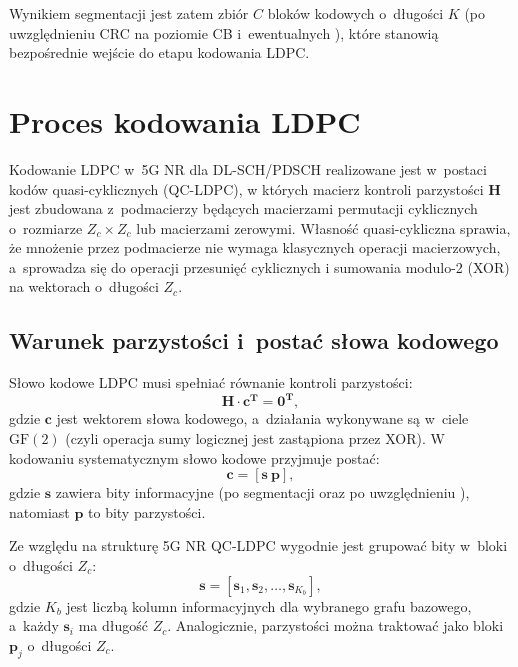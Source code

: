 Wynikiem segmentacji jest zatem zbiór $C$ bloków kodowych o~długości $K$ (po uwzględnieniu CRC na poziomie CB i~ewentualnych ), które stanowią bezpośrednie wejście do etapu kodowania LDPC.




\section{Proces kodowania LDPC}
\label{sec:analiza_proces_kodowania_ldpc}

Kodowanie LDPC w~5G NR dla DL-SCH/PDSCH realizowane jest w~postaci kodów quasi-cyklicznych (QC-LDPC),
w których macierz kontroli parzystości \textbf{H} jest zbudowana z~podmacierzy będących macierzami permutacji cyklicznych o~rozmiarze $Z_c \times Z_c$ lub macierzami zerowymi. Własność quasi-cykliczna sprawia,
że mnożenie przez podmacierze nie wymaga klasycznych operacji macierzowych, a~sprowadza się do operacji przesunięć cyklicznych
i sumowania modulo-2 (XOR) na wektorach o~długości $Z_c$.

\subsection{Warunek parzystości i~postać słowa kodowego}
Słowo kodowe LDPC musi spełniać równanie kontroli parzystości:
\begin{equation}
\mathbf{H} \cdot \mathbf{c}^\mathbf{T} = \mathbf{0}^\mathbf{T},
\label{eq:ldpc_parity_check}
\end{equation}
gdzie $\mathbf{c}$ jest wektorem słowa kodowego, a~działania wykonywane są w~ciele $\mathrm{GF}(2)$ (czyli operacja sumy logicznej jest zastąpiona przez XOR).
W kodowaniu systematycznym słowo kodowe przyjmuje postać:
\begin{equation}
\mathbf{c} = \left[\mathbf{s} \ \mathbf{p}\right],
\label{eq:codeword_systematic}
\end{equation}
gdzie $\mathbf{s}$ zawiera bity informacyjne (po segmentacji oraz po uwzględnieniu ), natomiast $\mathbf{p}$ to bity parzystości.

Ze względu na strukturę 5G NR QC-LDPC wygodnie jest grupować bity w~bloki o~długości $Z_c$:
\begin{equation}
\mathbf{s} = \left[\mathbf{s}_1,\mathbf{s}_2,\ldots,\mathbf{s}_{K_b}\right],
\label{eq:s_blocks}
\end{equation}
gdzie $K_b$ jest liczbą kolumn informacyjnych dla wybranego grafu bazowego, a~każdy
$\mathbf{s}_i$ ma długość $Z_c$. Analogicznie, parzystości można traktować jako bloki $\mathbf{p}_j$ o~długości $Z_c$.

